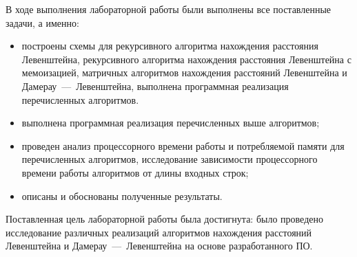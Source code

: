 
В ходе выполнения лабораторной работы были выполнены все поставленные задачи, а именно:
\begin{itemize}
    \item построены схемы для рекурсивного алгоритма нахождения расстояния Левенштейна, рекурсивного алгоритма нахождения расстояния Левенштейна с мемоизацией, матричных алгоритмов нахождения расстояний Левенштейна и Дамерау~---~Левенштейна, выполнена программная реализация перечисленных алгоритмов.
    \item выполнена программная реализация перечисленных выше алгоритмов;
    \item проведен анализ процессорного времени работы и потребляемой памяти для перечисленных алгоритмов, исследование зависимости процессорного времени работы алгоритмов от длины входных строк;
    \item описаны и обоснованы полученные результаты.
\end{itemize}

Поставленная цель лабораторной работы была достигнута: было проведено исследование различных реализаций алгоритмов нахождения расстояний Левенштейна и Дамерау~---~Левенштейна на основе разработанного ПО. 
